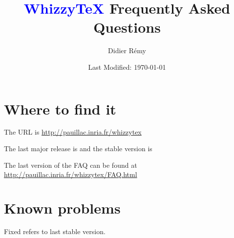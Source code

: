 \documentclass{article}
\title {\textcolor{blue}{WhizzyTeX}  Frequently Asked Questions}
\author {Didier R{\'{e}}my}
\date {Last Modified: \today}
\begin{document}
\maketitle

\tableofcontents

\section {Where to find it}

The URL is \url{http://pauillac.inria.fr/whizzytex}

The last major release is {\release}
and the stable version is {\version}

The last version of the FAQ can be found at 
\url{http://pauillac.inria.fr/whizzytex/FAQ.html}


\section {Known problems}

Fixed refers to last stable version.
\def \FIXED {\textit{Fixed in version $\ge$ {\version}}}
\end{document}
